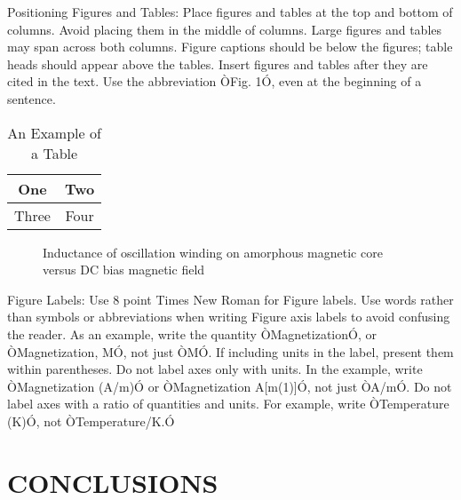 \documentclass[letterpaper, 10 pt,spanish, conference]{ieeeconf}  %
\begin{document}
Positioning Figures and Tables: Place figures and tables at the top and bottom of columns. Avoid placing them in the middle of columns. Large figures and tables may span across both columns. Figure captions should be below the figures; table heads should appear above the tables. Insert figures and tables after they are cited in the text. Use the abbreviation ÒFig. 1Ó, even at the beginning of a sentence.

\begin{table}[h]
\caption{An Example of a Table}
\label{table_example}
\begin{center}
\begin{tabular}{|c||c|}
\hline
One & Two\\
\hline
Three & Four\\
\hline
\end{tabular}
\end{center}
\end{table}


   \begin{figure}[thpb]
      \centering
      \caption{Inductance of oscillation winding on amorphous
       magnetic core versus DC bias magnetic field}
      \label{figurelabel}
   \end{figure}
   

Figure Labels: Use 8 point Times New Roman for Figure labels. Use words rather than symbols or abbreviations when writing Figure axis labels to avoid confusing the reader. As an example, write the quantity ÒMagnetizationÓ, or ÒMagnetization, MÓ, not just ÒMÓ. If including units in the label, present them within parentheses. Do not label axes only with units. In the example, write ÒMagnetization (A/m)Ó or ÒMagnetization {A[m(1)]}Ó, not just ÒA/mÓ. Do not label axes with a ratio of quantities and units. For example, write ÒTemperature (K)Ó, not ÒTemperature/K.Ó

\section{CONCLUSIONS}

\addtolength{\textheight}{-12cm}   %
\end{document}
